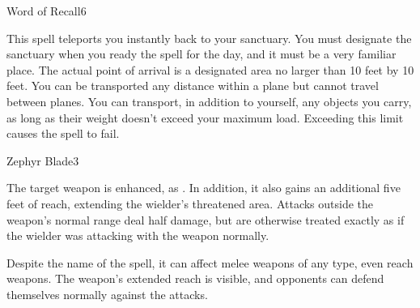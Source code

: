 \begin{spellsection}{Word of Recall}{6}
\begin{spellheader}
    \begin{spelltargetinginfo}
    \end{spelltargetinginfo}
\end{spellheader}
\begin{spellcontent}
    \begin{spelleffects}
        \spelleffect This spell teleports you instantly back to your sanctuary. You must designate the sanctuary when you ready the spell for the day, and it must be a very familiar place. The actual point of arrival is a designated area no larger than 10 feet by 10 feet. You can be transported any distance within a plane but cannot travel between planes. You can transport, in addition to yourself, any objects you carry, as long as their weight doesn't exceed your maximum load. Exceeding this limit causes the spell to fail.
    \end{spelleffects}
\end{spellcontent}
\begin{spellfooter}
\end{spellfooter}
\end{spellsection}

\begin{spellsection}{Zephyr Blade}{3}
\begin{spellheader}
    \begin{spelltargetinginfo}
    \end{spelltargetinginfo}
\end{spellheader}
\begin{spellcontent}
    \begin{spelleffects}
        \spelleffect The target weapon is enhanced, as . In addition, it also gains an additional five feet of reach, extending the wielder's threatened area. Attacks outside the weapon's normal range deal half damage, but are otherwise treated exactly as if the wielder was attacking with the weapon normally.
        \spelldur \durshort
    \end{spelleffects}
\end{spellcontent}
\begin{spellfooter}
    \spellnotes Despite the name of the spell, it can affect melee weapons of any type, even reach weapons. The weapon's extended reach is visible, and opponents can defend themselves normally against the attacks.
\end{spellfooter}
\end{spellsection}


